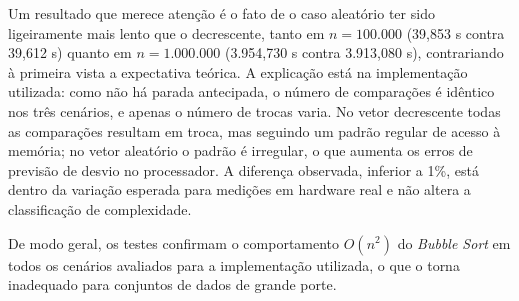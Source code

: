 \qquad Um resultado que merece atenção é o fato de o caso aleatório ter sido ligeiramente mais lento que o decrescente, tanto em $n = 100.000$ (39,853 s contra 39,612 s) quanto em $n = 1.000.000$ (3.954,730 s contra 3.913,080 s), contrariando à primeira vista a expectativa teórica. A explicação está na implementação utilizada: como não há parada antecipada, o número de comparações é idêntico nos três cenários, e apenas o número de trocas varia. No vetor decrescente todas as comparações resultam em troca, mas seguindo um padrão regular de acesso à memória; no vetor aleatório o padrão é irregular, o que aumenta os erros de previsão de desvio no processador. A diferença observada, inferior a 1\%, está dentro da variação esperada para medições em hardware real e não altera a classificação de complexidade.

\qquad De modo geral, os testes confirmam o comportamento $O(n^2)$ do \textit{Bubble Sort} em todos os cenários avaliados para a implementação utilizada, o que o torna inadequado para conjuntos de dados de grande porte.

\FloatBarrier